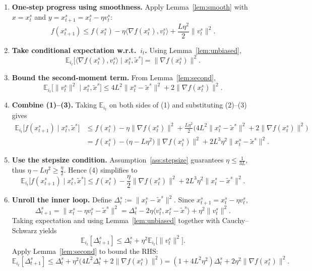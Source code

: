 \documentclass{article}
\begin{document}
\begin{enumerate}[label=[Step \arabic*], leftmargin=*]
\item \textbf{One‑step progress using smoothness.}  
Apply Lemma~\ref{lem:smooth} with $x=x_{t}^{s}$ and $y=x_{t+1}^{s}=x_{t}^{s}-\eta v_{t}^{s}$:
\[
f(x_{t+1}^{s})\le f(x_{t}^{s})-\eta\langle\nabla f(x_{t}^{s}),v_{t}^{s}\rangle+\frac{L\eta^{2}}{2}\|v_{t}^{s}\|^{2}.
\tag{1}
\]

\item \textbf{Take conditional expectation w.r.t.\ $i_t$.}  
Using Lemma~\ref{lem:unbiased},
\[
\mathbb{E}_{i_t}\!\big[\langle\nabla f(x_{t}^{s}),v_{t}^{s}\rangle\mid x_{t}^{s},\tilde{x}^{s}\big]
= \|\nabla f(x_{t}^{s})\|^{2}.
\tag{2}
\]

\item \textbf{Bound the second‑moment term.}  
From Lemma~\ref{lem:second},
\[
\mathbb{E}_{i_t}\!\big[\|v_{t}^{s}\|^{2}\mid x_{t}^{s},\tilde{x}^{s}\big]
\le 4L^{2}\|x_{t}^{s}-\tilde{x}^{s}\|^{2}+2\|\nabla f(x_{t}^{s})\|^{2}.
\tag{3}
\]

\item \textbf{Combine (1)–(3).}  
Taking $\mathbb{E}_{i_t}$ on both sides of (1) and substituting (2)–(3) gives
\[
\begin{aligned}
\mathbb{E}_{i_t}\!\big[f(x_{t+1}^{s})\mid x_{t}^{s},\tilde{x}^{s}\big]
&\le f(x_{t}^{s})-\eta\|\nabla f(x_{t}^{s})\|^{2}
   +\frac{L\eta^{2}}{2}\Big(4L^{2}\|x_{t}^{s}-\tilde{x}^{s}\|^{2}+2\|\nabla f(x_{t}^{s})\|^{2}\Big)\\
&= f(x_{t}^{s})-\Big(\eta-\!L\eta^{2}\Big)\|\nabla f(x_{t}^{s})\|^{2}
   +2L^{3}\eta^{2}\|x_{t}^{s}-\tilde{x}^{s}\|^{2}.
\end{aligned}
\tag{4}
\]

\item \textbf{Use the stepsize condition.}  
Assumption~\ref{ass:stepsize} guarantees $\eta\le \frac{1}{3L}$, thus $\eta-L\eta^{2}\ge \frac{\eta}{2}$. Hence (4) simplifies to
\[
\mathbb{E}_{i_t}\!\big[f(x_{t+1}^{s})\mid x_{t}^{s},\tilde{x}^{s}\big]
\le f(x_{t}^{s})-\frac{\eta}{2}\|\nabla f(x_{t}^{s})\|^{2}
   +2L^{3}\eta^{2}\|x_{t}^{s}-\tilde{x}^{s}\|^{2}.
\tag{5}
\]

\item \textbf{Unroll the inner loop.}  
Define $\Delta_{t}^{s}:= \|x_{t}^{s}-\tilde{x}^{s}\|^{2}$. Since $x_{t+1}^{s}=x_{t}^{s}-\eta v_{t}^{s}$,
\[
\Delta_{t+1}^{s}= \|x_{t}^{s}-\eta v_{t}^{s}-\tilde{x}^{s}\|^{2}
= \Delta_{t}^{s}-2\eta\langle v_{t}^{s},x_{t}^{s}-\tilde{x}^{s}\rangle+\eta^{2}\|v_{t}^{s}\|^{2}.
\]
Taking expectation and using Lemma~\ref{lem:unbiased} together with Cauchy–Schwarz yields
\[
\mathbb{E}_{i_t}[\Delta_{t+1}^{s}]
\le \Delta_{t}^{s}+ \eta^{2}\mathbb{E}_{i_t}\!\big[\|v_{t}^{s}\|^{2}\big].
\tag{6}
\]
Apply Lemma~\ref{lem:second} to bound the RHS:
\[
\mathbb{E}_{i_t}[\Delta_{t+1}^{s}]
\le \Delta_{t}^{s}+ \eta^{2}\big(4L^{2}\Delta_{t}^{s}+2\|\nabla f(x_{t}^{s})\|^{2}\big)
= (1+4L^{2}\eta^{2})\Delta_{t}^{s}+2\eta^{2}\|\nabla f(x_{t}^{s})\|^{2}.
\tag{7}
\]


\end{enumerate}
\end{document}
